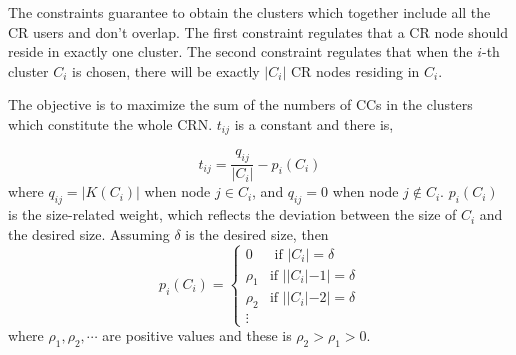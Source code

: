 \documentclass[10pt,journal,compsoc]{IEEEtran}
\theoremstyle{mytheoremstyle}
\theoremstyle{mytheoremstyle}
\theoremstyle{mytheoremstyle}
\begin{document}
The constraints guarantee to obtain the clusters which together include all the CR users and don't overlap.
The first constraint regulates that a CR node should reside in exactly one cluster.
The second constraint regulates that when the $i$-th cluster $C_i$ is chosen, there will be exactly $|C_i|$ CR nodes residing in $C_i$.

The objective is to maximize the sum of the numbers of CCs in the clusters which constitute the whole CRN.
$t_{ij}$ is a constant and there is,
%
%

\begin{equation}
t_{ij} = \frac{q_{ij}}{|C_i|} - p_i(C_i)
\end{equation}
where $q_{ij}= |K(C_i)|$ when node $j\in C_i$, and $q_{ij}= 0$ when node $j\notin C_i$.
$p_i(C_i)$ is the size-related weight, which reflects the deviation between the size of $C_i$ and the desired size.
Assuming $\delta$ is the desired size, then
$$
p_i(C_i) = \left\{ \begin{array}{rl}
0 &\mbox{ if $|C_i|=\delta$} \\
\rho_1 &\mbox{if $||C_i|-1|=\delta$} \\
\rho_2 &\mbox{if $||C_i|-2|=\delta$} \\
\vdots
\end{array} \right.
$$
where $\rho_1, \rho_2, \cdots$ are positive values and these is $\rho_2> \rho_1>0$.

\end{document}
